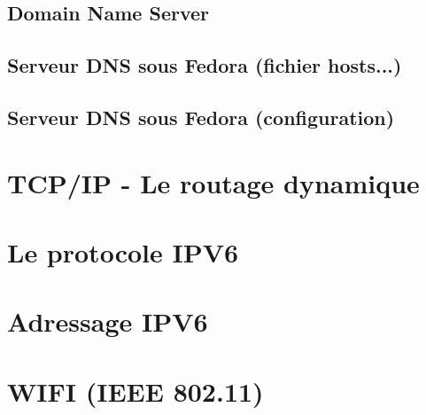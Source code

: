 \documentclass[12pt]{article}
\begin{document}
\subsection{Domain Name Server}


\subsection{Serveur DNS sous Fedora (fichier hosts...)}


\subsection{Serveur DNS sous Fedora (configuration)}





\section{TCP/IP - Le routage dynamique}

\section{Le protocole IPV6}

\section{Adressage IPV6}

\section{WIFI (IEEE 802.11)}
\end{document}
